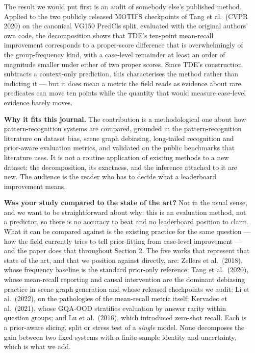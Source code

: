 \documentclass[11pt,a4paper]{article}
\begin{document}
The result we would put first is an audit of somebody else's published method. Applied to the
two publicly released MOTIFS checkpoints of Tang et al.\ (CVPR 2020) on the canonical VG150
PredCls split, evaluated with the original authors' own code, the decomposition shows that
TDE's ten-point mean-recall improvement corresponds to a proper-score difference that is
overwhelmingly of the group-frequency kind, with a case-level remainder at least an order of
magnitude smaller under either of two proper scores. Since TDE's construction subtracts a
context-only prediction, this characterises the method rather than indicting it --- but it
does mean a metric the field reads as evidence about rare predicates can move ten points
while the quantity that would measure case-level evidence barely moves.

\textbf{Why it fits this journal.} The contribution is a methodological one about how
pattern-recognition systems are compared, grounded in the pattern-recognition literature on
dataset bias, scene graph debiasing, long-tailed recognition and prior-aware evaluation
metrics, and validated on the public benchmarks that literature uses. It is not a routine
application of existing methods to a new dataset: the decomposition, its exactness, and the
inference attached to it are new. The audience is the reader who has to decide what a
leaderboard improvement means.

\textbf{Was your study compared to the state of the art?}
Not in the usual sense, and we want to be straightforward about why: this is an evaluation
method, not a predictor, so there is no accuracy to beat and no leaderboard position to
claim. What it can be compared against is the existing practice for the same question --- how
the field currently tries to tell prior-fitting from case-level improvement --- and the paper
does that throughout Section 2. The five works that represent that state of the art, and that
we position against directly, are: Zellers et al.\ (2018), whose frequency baseline is the
standard prior-only reference; Tang et al.\ (2020), whose mean-recall reporting and causal
intervention are the dominant debiasing practice in scene graph generation and whose released
checkpoints we audit; Li et al.\ (2022), on the pathologies of the mean-recall metric itself;
Kervadec et al.\ (2021), whose GQA-OOD stratifies evaluation by answer rarity within question
groups; and Lu et al.\ (2016), which introduced zero-shot recall. Each is a prior-aware
slicing, split or stress test of a \emph{single} model. None decomposes the gain between two
fixed systems with a finite-sample identity and uncertainty, which is what we add.
\end{document}
